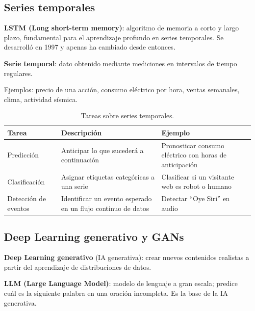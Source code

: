 \subsection{Series temporales}
\begin{definicion}
\textbf{LSTM (Long short-term memory)}: algoritmo de memoria a corto y largo plazo, fundamental para el aprendizaje profundo en series temporales. Se desarrolló en 1997 y apenas ha cambiado desde entonces.
\end{definicion}
\begin{definicion}
\textbf{Serie temporal}: dato obtenido mediante mediciones en intervalos de tiempo regulares.
\end{definicion}

Ejemplos: precio de una acción, consumo eléctrico por hora, ventas semanales, clima, actividad sísmica.

\begin{table}[H]
\centering
\caption{Tareas sobre series temporales.}
\label{tab:series-tareas}
\small
\begin{tabularx}{\textwidth}{@{}lXX@{}}
\toprule
\textbf{Tarea} & \textbf{Descripción} & \textbf{Ejemplo} \\
\midrule
Predicción & Anticipar lo que sucederá a continuación & Pronosticar consumo eléctrico con horas de anticipación \\
Clasificación & Asignar etiquetas categóricas a una serie & Clasificar si un visitante web es robot o humano \\
Detección de eventos & Identificar un evento esperado en un flujo continuo de datos & Detectar ``Oye Siri'' en audio \\
\bottomrule
\end{tabularx}
\end{table}

\subsection{Deep Learning generativo y GANs}

\begin{definicion}
\textbf{Deep Learning generativo} (IA generativa): crear nuevos contenidos realistas a partir del aprendizaje de distribuciones de datos.
\end{definicion}
\begin{definicion}
\textbf{LLM (Large Language Model)}: modelo de lenguaje a gran escala; predice cuál es la siguiente palabra en una oración incompleta. Es la base de la IA generativa.
\end{definicion}

